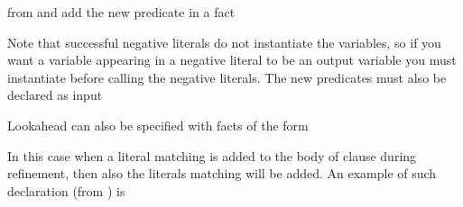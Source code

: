 \documentclass[letterpaper,10pt,english]{sphinxmanual}
\begin{document}
\sphinxAtStartPar
from  and add the new predicate in a  fact

\begin{sphinxVerbatim}[commandchars=\\\{\}]
\end{sphinxVerbatim}

\sphinxAtStartPar
Note that successful negative literals do not instantiate the variables, so if you want a variable appearing in a negative literal to be an output variable you must instantiate before calling the negative literals.
The new predicates must also be declared as input

\begin{sphinxVerbatim}[commandchars=\\\{\}]
\end{sphinxVerbatim}

\sphinxAtStartPar
Lookahead can also be specified with facts of the form

\begin{sphinxVerbatim}[commandchars=\\\{\}]
  
\end{sphinxVerbatim}

\sphinxAtStartPar
In this case when a literal matching  is added to the body of clause during refinement, then also the literals matching  will be added. An example of such declaration (from ) is

\begin{sphinxVerbatim}[commandchars=\\\{\}]
\PYG{p}{[}\PYG{p}{]}
\end{sphinxVerbatim}
\end{document}

